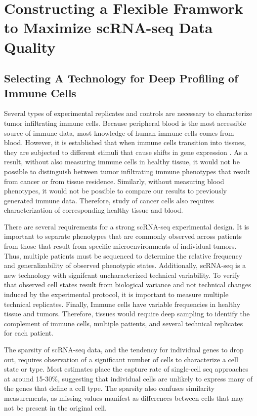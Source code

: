 \chapter[Constructing a Flexible Framwork to Maximize scRNA-seq Data Quality][Constructing a Flexible Framwork to Maximize scRNA-seq Data Quality]{Constructing a Flexible Framwork to Maximize scRNA-seq Data Quality}

\section{Selecting A Technology for Deep Profiling of Immune Cells}

Several types of experimental replicates and controls are necessary to characterize tumor infiltrating immune cells. 
Because peripheral blood is the most accessible source of immune data, most knowledge of human immune cells comes from blood. 
However, it is established that when immune cells transition into tissues, they are subjected to different stimuli that cause shifts in gene expression \citep{Fan2016}. 
As a result, without also measuring immune cells in healthy tissue, it would not be possible to distinguish between tumor infiltrating immune phenotypes that result from cancer or from tissue residence. 
Similarly, without measuring blood phenotypes, it would not be possible to compare our results to previously generated immune data. 
Therefore, study of cancer cells also requires characterization of corresponding healthy tissue and blood.

There are several requirements for a strong scRNA-seq experimental design. 
It is important to separate phenotypes that are commonly observed across patients from those that result from specific microenvironments of individual tumors. 
Thus, multiple patients must be sequenced to determine the relative frequency and generalizability of observed phenotypic states. 
Additionally, scRNA-seq is a new technology with signifcant uncharacterized technical variability. 
To verify that observed cell states result from biological variance and not technical changes induced by the experimental protocol, it is important to measure multiple technical replicates. 
Finally, Immune cells have variable frequencies in healthy tissue and tumors.  %
Therefore, tissues would require deep sampling to identify the complement of immune cells, multiple patients, and several technical replicates for each patient.  

The sparsity of scRNA-seq data, and the tendency for individual genes to drop out, requires observation of a significant number of cells to characterize a cell state or type. 
Most estimates place the capture rate of single-cell seq approaches at around 15-30\%, suggesting that individual cells are unlikely to express many of the genes that define a cell type. 
The sparsity also confuses similarity measurements, as missing values manifest as differences between cells that may not be present in the original cell. 

